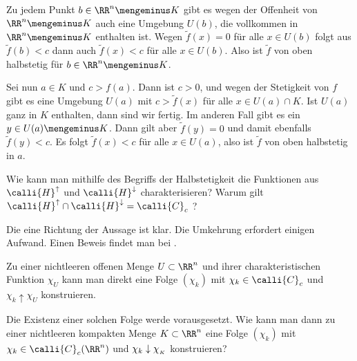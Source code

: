 \begin{antwort}
  Zu jedem Punkt $b\in\RR^n \mengeminus K$ gibt es wegen der Offenheit 
  von $\RR^n \mengeminus K$ auch eine Umgebung $U(b)$, die vollkommen in 
  $\RR^n \mengeminus K$ enthalten ist. 
  Wegen $\widetilde{f}(x)=0$ f\"ur alle $x\in U(b)$ 
  folgt aus $\widetilde{f}(b)<c$ dann auch $\widetilde{f}(x)<c$ f\"ur 
  alle $x\in U(b)$. Also 
  ist $\widetilde{f}$ von oben halbstetig f\"ur $b\in \RR^n \mengeminus K$. 

  Sei nun $a\in K$ und $c>f(a)$. Dann ist $c > 0$, und 
  wegen der Stetigkeit von $f$ gibt es eine Umgebung 
  $U(a)$ mit $c>\widetilde{f}(x)$ f\"ur alle $x\in U(a)\cap K$. Ist 
  $U(a)$ ganz in $K$ enthalten, dann sind wir fertig. 
  Im anderen Fall gibt es ein $y\in U(a)\mengeminus K$. 
  Dann gilt aber $\tilde{f}(y)=0$ und damit ebenfalls $\tilde{f}(y)<c$. 
  Es folgt $\tilde{f}(x)<c$ f\"ur alle $x\in U(a)$, also ist $\tilde{f}$ 
  von oben halbstetig in $a$. 
  \AntEnd
\end{antwort} 

\begin{frage}\label{11_halbstetig}
  Wie kann man mithilfe des Begriffs der Halbstetigkeit die Funktionen aus 
  $\calli{H}^\uparrow$ und $\calli{H}^\downarrow$ charakterisieren?
  Warum gilt 
  $\calli{H}^\uparrow \cap \calli{H}^\downarrow = \calli{C}_c$ ? 
\end{frage}

\begin{antwort}
  \noindent
  Die eine Richtung der Aussage ist klar. 
  Die Umkehrung erfordert einigen Aufwand. Einen Beweis findet man 
  {\zB} bei \citep{Forster}.
  \AntEnd
\end{antwort} 

\begin{frage}
  Zu einer nichtleeren offenen Menge $U\subset \RR^n$ und ihrer 
  charakteristischen Funktion 
  $\chi_U$ kann man direkt eine Folge $(\chi_k)$ mit 
  $\chi_k \in \calli{C}_c$ und $\chi_k \uparrow \chi_U$ konstruieren. 

  Die Existenz einer solchen Folge werde vorausgesetzt. 
  Wie kann man dann zu einer 
  nichtleeren kompakten Menge $K\subset\RR^n$ eine Folge $(\chi_k)$ mit 
  $\chi_k \in \calli{C}_c (\RR^n)$ und $\chi_k \downarrow \chi_{_{\footnotesize K}}$ konstruieren?
\end{frage}

